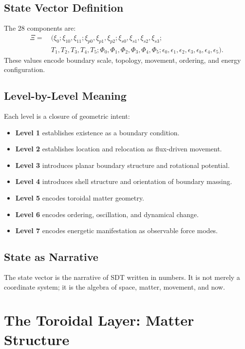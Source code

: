 \documentclass[12pt]{book}
\begin{document}
\section{State Vector Definition}
The 28 components are:
\begin{align}
\Xi =&\ (\xi_0; \xi_{10}, \xi_{11}; \xi_{p0}, \xi_{p1}, \xi_{p2}; \xi_{s0}, \xi_{s1}, \xi_{s2}, \xi_{s3}; \\
&\ T_1, T_2, T_3, T_4, T_5; \Phi_0, \Phi_1, \Phi_2, \Phi_3, \Phi_4, \Phi_5; \epsilon_0, \epsilon_1, \epsilon_2, \epsilon_3, \epsilon_b, \epsilon_4, \epsilon_5).
\end{align}
These values encode boundary scale, topology, movement, ordering, and energy configuration.

\section{Level-by-Level Meaning}
Each level is a closure of geometric intent:
\begin{itemize}
\item \textbf{Level 1} establishes existence as a boundary condition.
\item \textbf{Level 2} establishes location and relocation as flux-driven movement.
\item \textbf{Level 3} introduces planar boundary structure and rotational potential.
\item \textbf{Level 4} introduces shell structure and orientation of boundary massing.
\item \textbf{Level 5} encodes toroidal matter geometry.
\item \textbf{Level 6} encodes ordering, oscillation, and dynamical change.
\item \textbf{Level 7} encodes energetic manifestation as observable force modes.
\end{itemize}

\section{State as Narrative}
The state vector is the narrative of SDT written in numbers. It is not merely a coordinate system; it is
the algebra of space, matter, movement, and now.

\chapter{The Toroidal Layer: Matter Structure}
\end{document}
